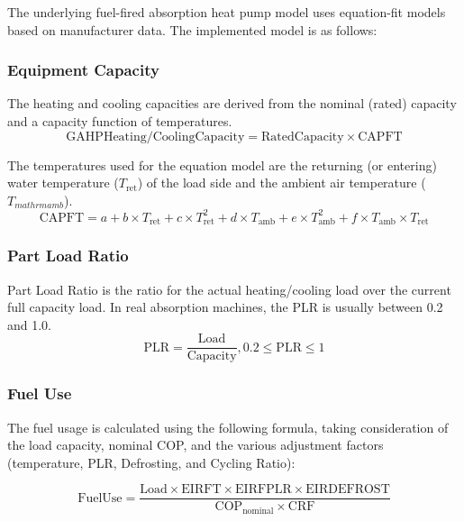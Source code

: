 The underlying fuel-fired absorption heat pump model uses equation-fit models based on manufacturer data. The implemented model is as follows:

\subsubsection{Equipment Capacity}
The heating and cooling capacities are derived from the nominal (rated) capacity and a capacity function of temperatures.
\begin{equation}
\mathrm{GAHP Heating/Cooling Capacity} = \mathrm{Rated Capacity} \times \mathrm{CAPFT}
\end{equation}

The temperatures used for the equation model are the returning (or entering) water temperature ($T_{\mathrm{ret}}$) of the load side and the ambient air temperature ($T_{mathrm{amb}}$).
\begin{equation}
\mathrm{CAPFT} = a + b \times T_{\mathrm{ret}} + c \times T_{\mathrm{ret}}^{2} + d \times T_{\mathrm{amb}} + e \times T_{\mathrm{amb}}^{2} + f \times T_{\mathrm{amb}} \times T_{\mathrm{ret}}
\end{equation}

\subsubsection{Part Load Ratio}
Part Load Ratio is the ratio for the actual heating/cooling load over the current full capacity load. In real absorption machines, the PLR is usually between 0.2 and 1.0.
\begin{equation}
\mathrm{PLR} = \frac{\mathrm{Load}}{\mathrm{Capacity}}, 0.2 \leq \mathrm{PLR} \leq 1
\end{equation}

\subsubsection{Fuel Use}
The fuel usage is calculated using the following formula, taking consideration of the load capacity, nominal COP, and the various adjustment factors (temperature, PLR, Defrosting, and Cycling Ratio):

\begin{equation}
\mathrm{Fuel Use} = \frac{\mathrm{Load} \times \mathrm{EIRFT} \times \mathrm{EIRFPLR} \times \mathrm{EIRDEFROST}}{\mathrm{COP}_\mathrm{nominal} \times \mathrm{CRF}}
\end{equation}


